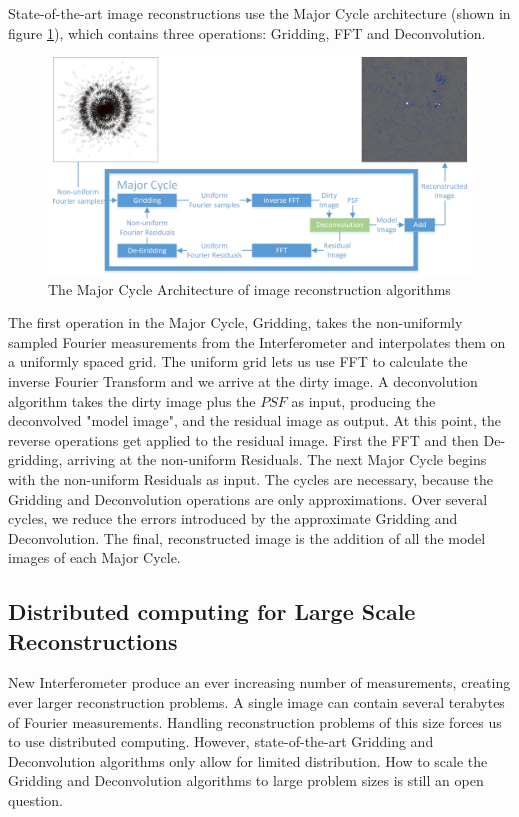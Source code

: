 State-of-the-art image reconstructions use the Major Cycle architecture (shown in figure \ref{hypo:major3}), which contains three operations: Gridding, FFT and Deconvolution.

\begin{figure}[h]
	\centering
	\includegraphics[width=0.80\linewidth]{./chapters/02.hypo/Major-Minor3.png}
	\caption{The Major Cycle Architecture of image reconstruction algorithms}
	\label{hypo:major3}
\end{figure}

The first operation in the Major Cycle, Gridding, takes the non-uniformly sampled Fourier measurements from the Interferometer and interpolates them on a uniformly spaced grid. The uniform grid lets us use FFT to calculate the inverse Fourier Transform and we arrive at the dirty image. A deconvolution algorithm takes the dirty image plus the $PSF$ as input, producing the deconvolved "model image", and the residual image as output. At this point, the reverse operations get applied to the residual image. First the FFT and then De-gridding, arriving at the non-uniform Residuals. The next Major Cycle begins with the non-uniform Residuals as input. The cycles are necessary, because the Gridding and Deconvolution operations are only approximations. Over several cycles, we reduce the errors introduced by the approximate Gridding and Deconvolution. The final, reconstructed image is the addition of all the model images of each Major Cycle. 

\subsection{Distributed computing for Large Scale Reconstructions}
New Interferometer produce an ever increasing number of measurements, creating ever larger reconstruction problems. A single image can contain several terabytes of Fourier measurements. Handling reconstruction problems of this size forces us to use distributed computing. However, state-of-the-art Gridding and Deconvolution algorithms only allow for limited distribution. How to scale the Gridding and Deconvolution algorithms to large problem sizes is still an open question.

